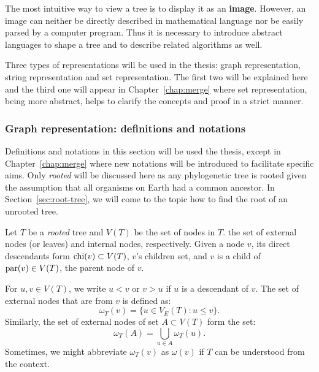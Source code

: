 The most intuitive way to view a tree is to display it as an {\bf image}. However, an image can
neither be directly described in mathematical language nor be easily parsed by a computer program.
Thus it is necessary to introduce abstract languages to shape a tree and to describe
related algorithms as well.

Three types of representations will be used in the thesis: graph representation,
string representation and
set representation. The first two will be explained
here and the third one will appear in Chapter~\ref{chap:merge} where set
representation, being more abstract, helps to clarify the concepts and proof
in a strict manner.

\subsubsection{Graph representation: definitions and notations}

Definitions and notations in this section will be used  the thesis,
except in Chapter~\ref{chap:merge} where new notations will be introduced
to facilitate specific aims. Only \emph{rooted}  will be discussed here
as any phylogenetic tree is rooted given the assumption that all organisms
on Earth had a common ancestor. In Section~\ref{sec:root-tree}, we
will come to the topic  how to find the root of an unrooted tree.

Let $T$ be a \emph{rooted} tree and $V(T)$ be the set of nodes in $T$.  the set of external nodes (or leaves) and internal nodes,
respectively. Given a node $v$, its direct descendants form $\mathrm{chi}(v)\subset V(T)$,
$v$'s children set, and $v$ is a child of $\mathrm{par}(v)\in V(T)$, the parent node
of $v$.

For $u,v\in V(T)$, we write $u<v$ or $v>u$ if $u$ is a descendant of $v$. The set
of external nodes that are  from $v$ is defined as:
\begin{equation}\label{equ:omega}
\omega_T(v)=\{u\in V_E(T):u\leq v\}.
\end{equation}
Similarly, the set of external nodes of set $A\subset V(T)$ form the set:
\begin{equation}
\omega_T(A)=\bigcup_{u\in A}\omega_T(u).
\end{equation}
Sometimes, we might abbreviate $\omega_T(v)$ as $\omega(v)$ if $T$ can be
understood from the context.

